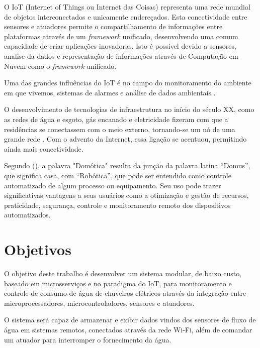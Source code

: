 O IoT (Internet of Things ou Internet das Coisas) representa uma rede mundial de objetos interconectados e unicamente endereçados. Esta conectividade entre sensores e atuadores permite o compartilhamento de informações entre plataformas através de um \textit{framework} unificado, desenvolvendo uma comum capacidade de criar aplicações inovadoras. Isto é possível devido a sensores, analise da dados e representação de informações através de Computação em Nuvem como o \textit{framework} unificado. \cite{RisteskaStojkoska2017}

Uma das grandes influências do IoT é no campo do monitoramento do ambiente em que vivemos, sistemas de alarmes e análise de dados ambientais \cite{Perumal2016}. %

O desenvolvimento de tecnologias de infraestrutura no início do século XX, como as redes de água e esgoto, gás encanado e eletricidade fizeram com que a residências se conectassem com o meio externo, tornando-se um nó de uma grande rede \cite{forty2007objetos}. Com o advento da Internet, essa ligação se acentuou, permitindo ainda mais conectividade. \cite{VarelaDeSouza} 

Segundo \citeauthor{VarelaDeSouza} (\citeyear{VarelaDeSouza}), a palavra "Domótica" resulta da junção da palavra latina
“Domus”, que significa casa, com “Robótica”, que pode ser entendido como controle automatizado de algum processo ou equipamento. Seu uso pode trazer significativas vantagens a seus usuários como a otimização e gestão de recursos, praticidade, segurança, controle e monitoramento remoto dos dispositivos automatizados.



\section{Objetivos} 

O objetivo deste trabalho é desenvolver um sistema modular, de baixo custo, baseado em microsserviços e no paradigma do IoT, para monitoramento e controle de consumo de água de chuveiros elétricos através da integração entre microprocessadores, microcontroladores, sensores e atuadores. 

O sistema será capaz de armazenar e exibir dados vindos dos sensores de fluxo de água em sistemas remotos, conectados através da rede Wi-Fi, além de comandar um atuador para interromper o fornecimento da água.

